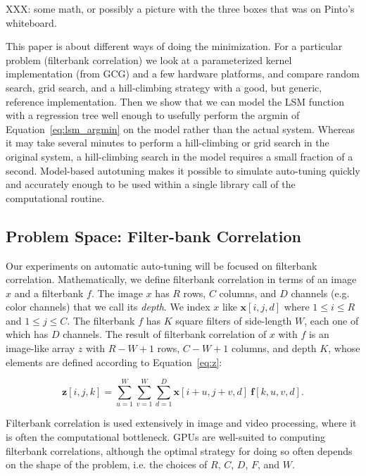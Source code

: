 \documentclass{sig-alternate}
\begin{document}
XXX: some math, or possibly a picture with the three boxes that was on Pinto's
whiteboard.

This paper is about different ways of doing the minimization.
For a particular problem (filterbank correlation) we
look at a parameterized kernel implementation (from GCG)
and a few hardware platforms, and compare
random search, grid search, and a hill-climbing strategy with a good, but
generic, reference implementation.
Then we show that we can model the LSM function with a regression tree
well enough to usefully perform the argmin of Equation~\ref{eq:lsm_argmin}
on the model rather than the actual system. Whereas it may take several
minutes to perform a hill-climbing or grid search in the original system,
a hill-climbing search in the model requires a small fraction of a second.
Model-based autotuning makes it possible to simulate auto-tuning quickly and
accurately enough to be used within a single library call of the computational
routine.



\subsection{Problem Space: Filter-bank Correlation}

Our experiments on automatic auto-tuning will be focused on filterbank
correlation.  Mathematically, we define filterbank correlation in terms of an
image $x$ and a filterbank $f$.
The image $x$ has $R$ rows, $C$ columns, and $D$ channels (e.g. color
channels) that we call its {\em depth}. We index $x$ like $\mathbf{x}[i,j,d]$
where $1 \leq i \leq R$ and $1 \leq j \leq C$.
The filterbank $f$ has $K$ square filters of side-length $W$, each one of
which has $D$ channels.
The result of filterbank correlation of $x$ with $f$ is an image-like array
$z$ with $R-W+1$ rows, $C-W+1$ columns, and depth $K$, whose elements are
defined according to Equation~\ref{eq:z}:

\begin{equation}
    \mathbf{z}[i,j,k] = \sum_{u=1}^{W} \sum_{v=1}^{W} \sum_{d=1}^D
        \mathbf{x}[i+u, j+v, d]~ \mathbf{f}[k, u, v, d].
        \label{eq:z}
\end{equation}

Filterbank correlation is used extensively in image and video processing,
where it is often the computational bottleneck.
GPUs are well-suited to computing filterbank correlations, although the
optimal strategy for doing so often depends on the shape of the problem, i.e.
the choices of $R$, $C$, $D$, $F$, and $W$.
\end{document}
